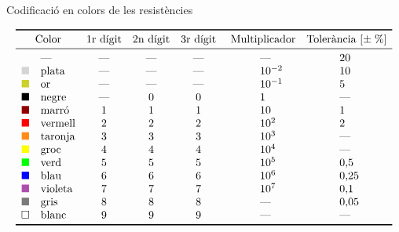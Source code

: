 \begin{table}[htb]
   \caption{Codificaci\'{o} en colors de les resist\`{e}ncies}
   \[ \begin{array}{llccc>{\hspace{3em}}l>{\hspace{3em}}l}
   \toprule[1pt]
   \multicolumn{2}{c}{\text{Color}} & \text{1r d\'{\i}git} & \text{2n d\'{\i}git} & \text{3r d\'{\i}git} & \multicolumn{1}{c}{\text{
   Multiplicador}} & \multicolumn{1}{c}{\text{Toler\`{a}ncia }[\pm\;\%]}
   \\
   \midrule
           &\text{---}     &  \text{---} &  \text{---} &  \text{---} &  \text{---} & 20 \\
   \textcolor[rgb]{0.83,0.83,0.83}{\blacksquare} &\text{plata}   &  \text{---} &  \text{---} &  \text{---} &  10^{-2} & 10 \\
   \textcolor[rgb]{0.80,0.82,0.17}{\blacksquare} &\text{or}      &  \text{---} &  \text{---} &  \text{---} &  10^{-1} & 5 \\
   \blacksquare &\text{negre}   &  \text{---}   &  0   &  0   &  1   & \text{---} \\
   \textcolor[rgb]{0.57,0.00,0.00}{\blacksquare} &\text{marr\'{o}}   &  1   &  1   &  1   &  10   & 1 \\
   \textcolor[rgb]{1.00,0.00,0.00}{\blacksquare} &\text{vermell} &  2   &  2   &  2   &  10^2   & 2 \\
   \textcolor[rgb]{1.00,0.55,0.09}{\blacksquare} &\text{taronja} &  3   &  3   &  3   &  10^3   & \text{---} \\
   \textcolor[rgb]{1.00,1.00,0.00}{\blacksquare} &\text{groc}    &  4   &  4   &  4   &  10^4   & \text{---} \\
   \textcolor[rgb]{0.00,1.00,0.00}{\blacksquare} &\text{verd}    &  5   &  5   &  5   &  10^5   & 0{,}5 \\
   \textcolor[rgb]{0.00,0.00,1.00}{\blacksquare} &\text{blau}    &  6   &  6   &  6   &  10^6   & 0{,}25 \\
   \textcolor[rgb]{0.68,0.31,0.68}{\blacksquare} &\text{violeta} &  7   &  7   &  7   &  10^7   & 0{,}1 \\
   \textcolor[rgb]{0.48,0.48,0.48}{\blacksquare} &\text{gris}    &  8   &  8   &  8   &  \text{---}   & 0{,}05 \\
   \square &\text{blanc}   &  9   &  9   &  9   &  \text{---}   & \text{---} \\
   \bottomrule[1pt]
   \end{array}   \]
\end{table}

